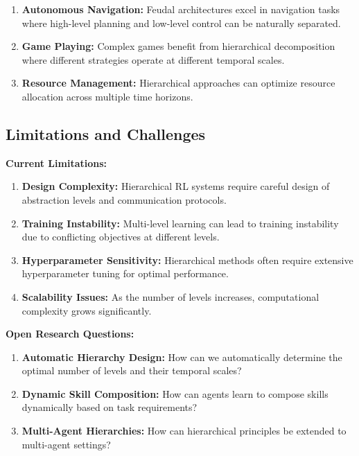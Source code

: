 \documentclass[12pt]{article}
\begin{document}
{{\begin{enumerate}
    \item \textbf{Autonomous Navigation:} Feudal architectures excel in navigation tasks where high-level planning and low-level control can be naturally separated.
    
    \item \textbf{Game Playing:} Complex games benefit from hierarchical decomposition where different strategies operate at different temporal scales.
    
    \item \textbf{Resource Management:} Hierarchical approaches can optimize resource allocation across multiple time horizons.
\end{enumerate}

\subsection{Limitations and Challenges}

\textbf{Current Limitations:}
\begin{enumerate}
    \item \textbf{Design Complexity:} Hierarchical RL systems require careful design of abstraction levels and communication protocols.
    
    \item \textbf{Training Instability:} Multi-level learning can lead to training instability due to conflicting objectives at different levels.
    
    \item \textbf{Hyperparameter Sensitivity:} Hierarchical methods often require extensive hyperparameter tuning for optimal performance.
    
    \item \textbf{Scalability Issues:} As the number of levels increases, computational complexity grows significantly.
\end{enumerate}

\textbf{Open Research Questions:}
\begin{enumerate}
    \item \textbf{Automatic Hierarchy Design:} How can we automatically determine the optimal number of levels and their temporal scales?
    
    \item \textbf{Dynamic Skill Composition:} How can agents learn to compose skills dynamically based on task requirements?
    
    \item \textbf{Multi-Agent Hierarchies:} How can hierarchical principles be extended to multi-agent settings?
    

\end{enumerate}}}
\end{document}
